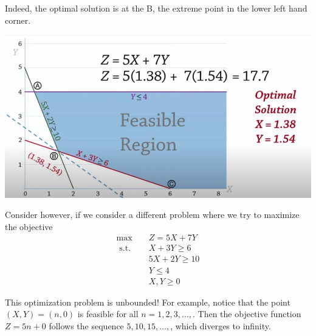 Indeed, the optimal solution is at the B, the extreme point in the lower left hand corner.


\begin{center}
\includegraphics[scale = 0.4]{screenshots/example1-optimal-solution}
\end{center}


Consider however, if we consider a different problem where we try to maximize the objective
\begin{align*}
\max \quad & Z = 5X + 7Y\\ 
\text { s.t. } \quad & X+3 Y \geq 6 \\ 
&5 X+ 2 Y \geq 10 \\ 
&Y  \leq 4 \\ 
&X, Y  \geq 0 
\end{align*}

\begin{solution}
This optimization problem is unbounded!  For example, notice that the point $(X,Y) = (n,0)$ is feasible for all $n=1,2,3,\dots,$.   Then the objective function $Z = 5n + 0$ follows the sequence $5, 10, 15, \dots,$, which diverges to infinity.   
\end{solution}


